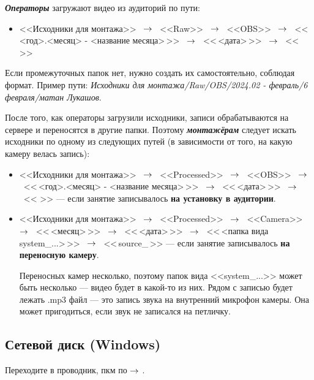 \vspace{5pt}

\textit{\textbf{Операторы}} загружают видео из аудиторий по пути:
\begin{itemize}
  \item <<Исходники для монтажа>> \ $\rightarrow$ \ <<Raw>> \ $\rightarrow$ \ <<OBS>> \ $\rightarrow$ \ <<\,<год>.<месяц> - <название месяца>\,>> \ $\rightarrow$ \ <<\,<дата>\,>> \ $\rightarrow$ \ <<\,<название предмета и ФИО лектора>\,>>
\end{itemize}
Если промежуточных папок нет, нужно создать их самостоятельно, соблюдая формат. Пример пути: \textit{Исходники для монтажа/Raw/OBS/2024.02 - февраль/6 февраля/матан Лукашов}.

После того, как операторы загрузили исходники, записи обрабатываются на сервере и переносятся в другие папки. Поэтому \textit{\textbf{монтажёрам}} следует искать исходники по одному из следующих путей (в зависимости от того, на какую камеру велась запись):
\begin{itemize}
  \item <<Исходники для монтажа>> \ $\rightarrow$ \ <<Processed>> \ $\rightarrow$ \ <<OBS>> \ $\rightarrow$ \ <<\,<год>.<месяц> - <название месяца>\,>> \ $\rightarrow$ \ <<\,<дата>\,>> \ $\rightarrow$ \ <<\,<название предмета и ФИО лектора>\,>> --- если занятие записывалось \textbf{на установку в аудитории}.
  \item <<Исходники для монтажа>> \ $\rightarrow$ \ <<Processed>> \ $\rightarrow$ \ <<Camera>> \ $\rightarrow$ \ <<\,<месяц>\,>> \ $\rightarrow$ \ <<\,<дата>\,>> \ $\rightarrow$ \ <<\,<папка вида system\_...>\,>> \ $\rightarrow$ \ <<\,source\_<время лекции>\,>> --- если занятие записывалось \textbf{на переносную камеру}.

        Переносных камер несколько, поэтому папок вида <<system\_...>> может быть несколько --- видео будет в какой-то из них. Рядом с записью будет лежать \textsf{.mp3} файл --- это запись звука на внутренний микрофон камеры. Она может пригодиться, если звук не записался на петличку.
\end{itemize}

\subsection{Сетевой диск (Windows)}

Переходите в проводник, пкм по  $\rightarrow$ .

